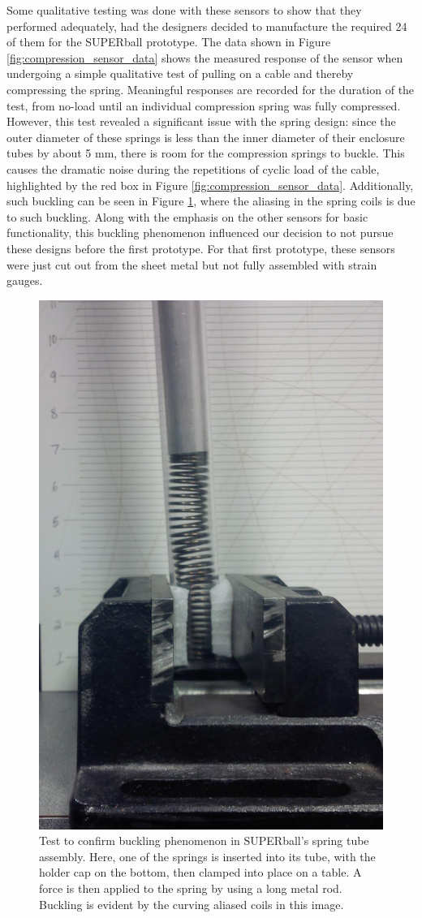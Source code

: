 \documentclass[12pt]{report}
\begin{document}
Some qualitative testing was done with these sensors to show that they performed adequately, had the designers decided to manufacture the required 24 of them for the SUPERball prototype.
The data shown in Figure \ref{fig:compression_sensor_data} shows the measured response of the sensor when undergoing a simple qualitative test of pulling on a cable and thereby compressing the spring.
Meaningful responses are recorded for the duration of the test, from no-load until an individual compression spring was fully compressed.
However, this test revealed a significant issue with the spring design: since the outer diameter of these springs is less than the inner diameter of their enclosure tubes by about 5 mm, there is room for the compression springs to buckle.
This causes the dramatic noise during the repetitions of cyclic load of the cable, highlighted by the red box in Figure \ref{fig:compression_sensor_data}.
Additionally, such buckling can be seen in Figure \ref{fig:spring_buckling}, where the aliasing in the spring coils is due to such buckling.
Along with the emphasis on the other sensors for basic functionality, this buckling phenomenon influenced our decision to not pursue these designs before the first prototype.
For that first prototype, these sensors were just cut out from the sheet metal but not fully assembled with strain gauges.

\begin{figure}[thpb]
      \centering
      \includegraphics[width=.5\columnwidth]{img/spring_buckling_cropped.jpg}
      \caption{Test to confirm buckling phenomenon in SUPERball's spring tube assembly. Here, one of the springs is inserted into its tube, with the holder cap on the bottom, then clamped into place on a table. A force is then applied to the spring by using a long metal rod. Buckling is evident by the curving aliased coils in this image.}
      \label{fig:spring_buckling}
      \vspace{-0.2cm}
\end{figure}
\end{document}
